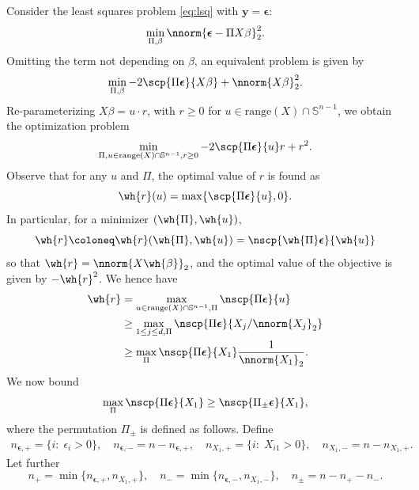 \documentclass[11pt]{article}
\def\y{\mathbf{y}}
\def\eps{\boldsymbol{\epsilon}}
\begin{document}
Consider the least squares problem \eqref{eq:lsq} with $\y = \eps$:
\begin{equation*}
\min_{\Pi, \beta} \nnorm{\eps - \Pi X \beta}_2^2. 
\end{equation*} 
Omitting the term not depending on $\beta$, an equivalent problem is given by 
\begin{equation*}
\min_{\Pi, \beta} -2 \scp{\Pi \eps}{X \beta} + \nnorm{X \beta}_2^2. 
\end{equation*}
Re-parameterizing $X \beta = u \cdot r$, with $r \geq 0$ for $u \in \text{range}(X) \cap \mathbb{S}^{n-1}$, we obtain the optimization problem
\begin{equation*}
\min_{\Pi, u \in \text{range}(X) \cap \mathbb{S}^{n-1}, r \geq 0}  -2 \scp{\Pi \eps}{u} r + r^2. 
\end{equation*}
Observe that for any $u$ and $\Pi$, the optimal value of $r$ is found as 
\begin{equation*}
\wh{r}(u) = \max\{\scp{\Pi \eps}{u},0 \}. 
\end{equation*}
In particular, for a minimizer $(\wh{\Pi}, \wh{u})$,
\begin{equation*}
\wh{r} \coloneq \wh{r}(\wh{\Pi}, \wh{u}) = \nscp{\wh{\Pi} \eps}{\wh{u}}
\end{equation*}
so that $\wh{r} = \nnorm{X \wh{\beta}}_2$, and the optimal value of the objective is given by 
$-\wh{r}^2$. We hence have  
\begin{align*}
\wh{r} &= \max_{u \in \text{range}(X) \cap \mathbb{S}^{n-1}, \Pi} \nscp{\Pi \eps}{u} \\
       &\geq  \max_{1 \leq j \leq d, \Pi} \nscp{\Pi \eps}{X_j / \nnorm{X_j}_2} \\
       &\geq  \max_{\Pi} \nscp{\Pi \eps}{X_1} \frac{1}{\nnorm{X_1}_2}. 
\end{align*}
We now bound
\begin{equation*}
\max_{\Pi} \nscp{\Pi \eps}{X_1} \geq \nscp{\Pi_{\pm} \eps}{X_1},
\end{equation*}
where the permutation $\Pi_{\pm}$ is defined as follows. Define 
\begin{align*}
n_{\eps,+} = \{i:\; \epsilon_i > 0\}, \quad n_{\eps,-} = n - n_{\eps,+},  \quad n_{X_1,+} = \{i:\; X_{i1} > 0\}, \quad n_{X_1,-} = n - n_{X_1,+}.
\end{align*}
Let further 
\begin{equation}\label{eq:nplusnminus}
n_+ = \min\{n_{\eps,+},  n_{X_1,+} \},  \quad n_- = \min\{n_{\eps,-},  n_{X_1,-} \}, \quad 
n_{\pm} = n - n_+ - n_-. 
\end{equation}
\end{document}
